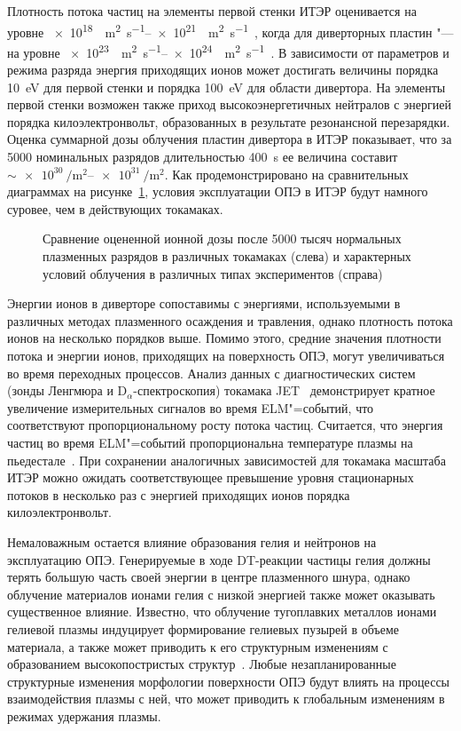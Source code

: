 Плотность потока частиц на элементы первой стенки ИТЭР оценивается на уровне \SIrange{e18}{e21}{\per\metre\squared\per\second}~\cite{DeTemmerman2021, Rivals2022}, когда для диверторных пластин "--- на уровне \SIrange{e23}{e24}{\per\metre\squared\per\second}~\cite{Pitts2019,Orrico2023}. В зависимости от параметров и режима разряда энергия приходящих ионов может достигать величины порядка \SI{10}{\electronvolt} для первой стенки и порядка \SI{100}{\electronvolt} для области дивертора. На элементы первой стенки возможен также приход высокоэнергетичных нейтралов с энергией порядка килоэлектронвольт, образованных в результате резонансной перезарядки. Оценка суммарной дозы облучения пластин дивертора в ИТЭР показывает, что за 5000 номинальных разрядов длительностью \SI{400}{\second} ее величина составит \( \sim \SIrange{e30}{e31}{\per\metre\squared} \). Как продемонстрировано на сравнительных диаграммах на рисунке~\cref{fig:ch1/fluxes_comparison}, условия эксплуатации ОПЭ в ИТЭР будут намного суровее, чем в действующих токамаках.
\begin{figure}[ht]
    \caption{Сравнение оцененной ионной дозы после 5000 тысяч нормальных плазменных разрядов в различных токамаках (слева) и характерных условий облучения в различных типах экспериментов (справа)~\cite{DeTemmerman2018}}\label{fig:ch1/fluxes_comparison}
\end{figure}
Энергии ионов в диверторе сопоставимы с энергиями, используемыми в различных методах плазменного осаждения и травления, однако плотность потока ионов на несколько порядков выше. Помимо этого, средние значения плотности потока и энергии ионов, приходящих на поверхность ОПЭ, могут увеличиваться во время переходных процессов. Анализ данных с диагностических систем (зонды Ленгмюра и \(\mathrm{D}_\alpha\)-спектроскопия) токамака JET~\cite{Guillemaut2015,Guillemaut2018} демонстрирует кратное увеличение измерительных сигналов во время ELM"=событий, что соответствуют пропорциональному росту потока частиц. Считается, что энергия частиц во время ELM"=событий пропорциональна температуре плазмы на пьедестале~\cite{Eich2017}. При сохранении аналогичных зависимостей для токамака масштаба ИТЭР можно ожидать соответствующее превышение уровня стационарных потоков в несколько раз с энергией приходящих ионов порядка килоэлектронвольт.

Немаловажным остается влияние образования гелия и нейтронов на эксплуатацию ОПЭ. Генерируемые в ходе DT-реакции частицы гелия должны терять большую часть своей энергии в центре плазменного шнура, однако облучение материалов ионами гелия с низкой энергией также может оказывать существенное влияние. Известно, что облучение тугоплавких металлов ионами гелиевой плазмы индуцирует формирование гелиевых пузырей в объеме материала, а также может приводить к его структурным изменениям с образованием высокопостристых структур~\cite{Ueda2018,Kajita2018,Fedorovich2019}. Любые незапланированные структурные изменения морфологии поверхности ОПЭ будут влиять на процессы взаимодействия плазмы с ней, что может приводить к глобальным изменениям в режимах удержания плазмы.

